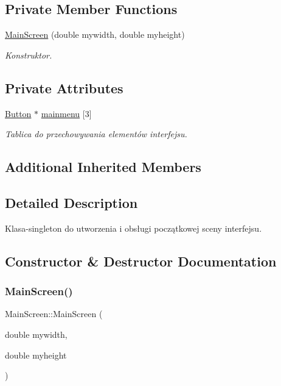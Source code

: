 \subsection*{Private Member Functions}
\begin{DoxyCompactItemize}
\item 
\mbox{\hyperlink{class_main_screen_a98c73ac5558f7f186f749b0d925faa37}{Main\+Screen}} (double mywidth, double myheight)
\begin{DoxyCompactList}\small\item\em Konstruktor. \end{DoxyCompactList}\end{DoxyCompactItemize}
\subsection*{Private Attributes}
\begin{DoxyCompactItemize}
\item 
\mbox{\label{class_main_screen_a0ada28677d410063e649fd445bfc5cc5}} 
\mbox{\hyperlink{class_button}{Button}} $\ast$ \mbox{\hyperlink{class_main_screen_a0ada28677d410063e649fd445bfc5cc5}{mainmenu}} \mbox{[}3\mbox{]}
\begin{DoxyCompactList}\small\item\em Tablica do przechowywania elementów interfejsu. \end{DoxyCompactList}\end{DoxyCompactItemize}
\subsection*{Additional Inherited Members}


\subsection{Detailed Description}
Klasa-\/singleton do utworzenia i obsługi początkowej sceny interfejsu. 

\subsection{Constructor \& Destructor Documentation}
\mbox{\label{class_main_screen_a98c73ac5558f7f186f749b0d925faa37}} 
\subsubsection{\texorpdfstring{MainScreen()}{MainScreen()}}
{\footnotesize\ttfamily Main\+Screen\+::\+Main\+Screen (\begin{DoxyParamCaption}\item[{double}]{mywidth,  }\item[{double}]{myheight }\end{DoxyParamCaption})\hspace{0.3cm}{\ttfamily [private]}}




